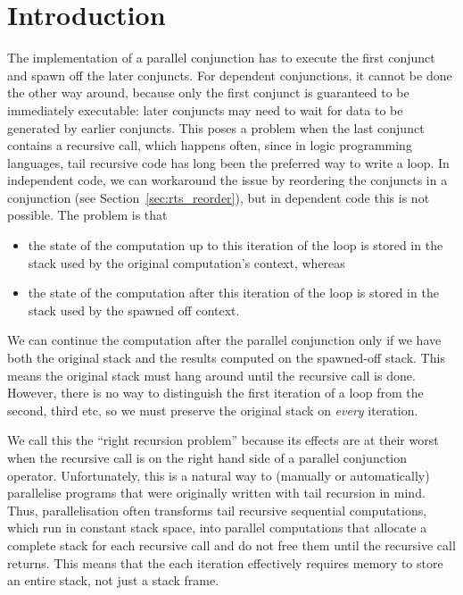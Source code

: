 \section{Introduction}
\label{sec:lc_intro}


The implementation of a parallel conjunction
has to execute the first conjunct and spawn off the later conjuncts.
For dependent conjunctions, it cannot be done the other way around,
because only the first conjunct is guaranteed to be immediately executable:
later conjuncts may need to wait for data to be generated by earlier
conjuncts.
This poses a problem when the last conjunct contains a recursive call,
which happens often,
since in logic programming languages,
tail recursive code has long been the preferred way to write a loop.
In independent code,
we can workaround the issue by reordering the conjuncts
in a conjunction (see Section~\ref{sec:rts_reorder}),
but in dependent code this is not possible.
The problem is that
\begin{itemize}
\item
the state of the computation up to this iteration of the loop
is stored in the stack used by the original computation's context,
whereas
\item
the state of the computation after this iteration of the loop
is stored in the stack used by the spawned off context.
\end{itemize}
We can continue the computation after the parallel conjunction
only if we have both the original stack
and the results computed on the spawned-off stack.
This means the original stack must hang around
until the recursive call is done.
However, there is no way to distinguish
the first iteration of a loop from the second, third etc,
so we must preserve the original stack on \emph{every} iteration.

We call this the ``right recursion problem'' because its effects are at
their worst when the recursive call is on the right hand side of a
parallel conjunction operator.
Unfortunately,
this is a natural way to (manually or automatically) parallelise programs
that were originally written with tail recursion in mind.
Thus, parallelisation often
transforms tail recursive sequential computations,
which run in constant stack space,
into parallel computations
that allocate a complete stack for each recursive call
and do not free them until the recursive call returns.
This means that the each iteration effectively requires memory
to store an entire stack, not just a stack frame.

